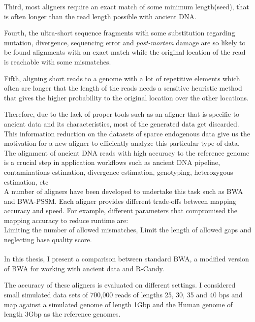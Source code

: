 \documentclass[11pt,a4paper]{report}
\begin{document}
Third, most aligners require an exact match of some minimum length(seed), that is often longer than the read length possible with ancient DNA.

Fourth, the ultra-short sequence fragments with some 
substitution regarding mutation, divergence,  sequencing error and \emph{post-mortem} damage are so likely to be found alignments with an exact match while the original location of 
the read is reachable with some mismatches.

Fifth, aligning short reads to a genome with a lot of repetitive elements which often are longer that the length of the reads needs a sensitive heuristic method that gives the higher probability to the original location over the other locations.

Therefore, due to the lack of proper tools such as an aligner that is specific to ancient data and its characteristics, most of the generated data get discarded. 
This information reduction on the datasets of sparce endogenous data give us the motivation for 
a new aligner to efficiently analyze this particular type of data.
\\
The alignment of ancient DNA reads with high accuracy to the reference genome is a crucial step in application workflows such as ancient DNA pipeline, contaminations estimation, divergence estimation, genotyping, heterozygous estimation, etc
\\
A number of aligners have been developed to undertake this task such as BWA\cite{bwa} and BWA-PSSM\cite{pssm}.
Each aligner provides different trade-offs between mapping accuracy and speed. 
For example, different parameters that compromised the mapping accuracy to reduce runtime are\cite{benchmarking}:\\
Limiting the number of allowed mismatches,
Limit the length of allowed gaps and
neglecting base quality score.
\\\\

In this thesis, I present a comparison between standard BWA, a modified version of BWA for working with ancient data and R-Candy.

The accuracy of these aligners is evaluated on different settings. 
I considered small simulated data sets of 700,000 reads of lengths 25, 30, 35 and 40 bps and map against a simulated genome of length 1Gbp and the Human genome of length 3Gbp as the reference genomes.
\end{document}
